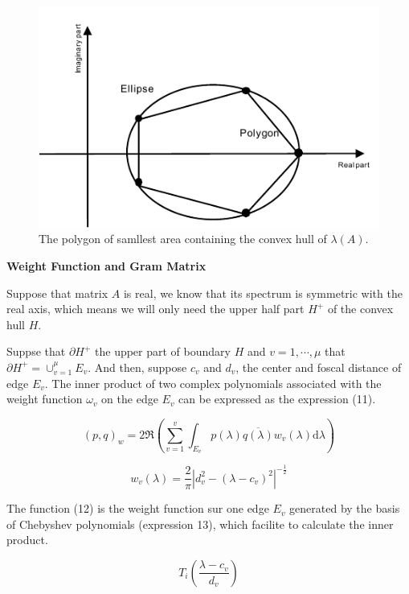 \begin{figure}[htbp]
	\centering
	\includegraphics[width=5.4in]{fig/polygon.pdf}
	\caption{The polygon of samllest area containing the convex hull of $\lambda(A)$.}
	\label{polygon}
\end{figure}


\textbf{Weight Function and Gram Matrix}


Suppose that matrix \(A\) is real, we know that its spectrum is symmetric with the real axis, which means we will only need the upper half part \(H^+\) of the convex hull \(H\).

Suppse that \(\partial H^+\) the upper part of boundary \(H\) and \(v=1,\cdots,\mu\) that \(\partial H^+=\cup_{v=1}^\mu E_v\). And then, suppose \(c_v\) and \(d_v\), the center and foscal distance of edge \(E_v\). The inner product of two complex polynomials associated with the weight function \(\omega_v\) on the edge \(E_v\) can be expressed as the expression (11).

\begin{equation}
(p,q)_w=2\Re(\sum_{v=1}^v \int_{E_v}p(\lambda) \overline{q(\lambda)} w_v(\lambda)\mathrm{d}\lambda)
\end{equation}

\begin{equation}
w_v(\lambda)=\frac{2}{\pi}|d_v^2-(\lambda-c_v)^2|^{-\frac{1}{2}}
\end{equation}

The function (12) is the weight function sur one edge \(E_v\) generated by the basis of Chebyshev polynomials (expression 13), which facilite to calculate the inner product.

\begin{equation}
T_i(\frac{\lambda-c_v}{d_v})
\end{equation} 

